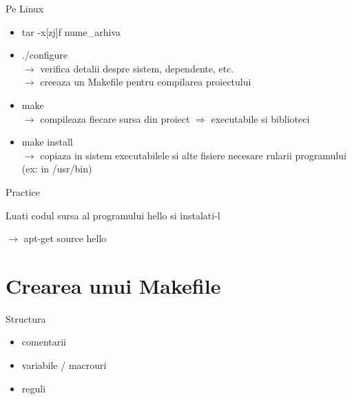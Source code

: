 \documentclass{beamer}
\begin{document}
    \begin{frame}{Pe Linux}
    \begin{itemize}
    \setlength{\itemsep}{0.7cm}
    \item {\ttfamily tar -x[zj]f nume\_arhiva}
    \item {\ttfamily ./configure}\\$\rightarrow$ verifica detalii despre sistem, dependente, etc.\\$\rightarrow$ creeaza un Makefile pentru compilarea proiectului
    \item {\ttfamily make}\\$\rightarrow$ compileaza fiecare sursa din proiect $\Rightarrow$ executabile si biblioteci
    \item {\ttfamily make install}\\$\rightarrow$ copiaza in sistem executabilele si alte fisiere necesare rularii programului (ex: in {\ttfamily /usr/bin})
    \end{itemize}
    \end{frame}

    \begin{frame}{Practice}
    \par Luati codul sursa al programului hello si instalati-l
    \vspace{0.6cm}
    \par $\rightarrow$ {\ttfamily apt-get source hello}
    \end{frame}

\section{Crearea unui Makefile}
    \frame{\tableofcontents[currentsection]}

    \begin{frame}{Structura}
    \begin{itemize}
    \setlength{\itemsep}{0.6cm}
    \item comentarii
    \item variabile / macrouri
    \item reguli
    \end{itemize}
    \end{frame}
\end{document}
